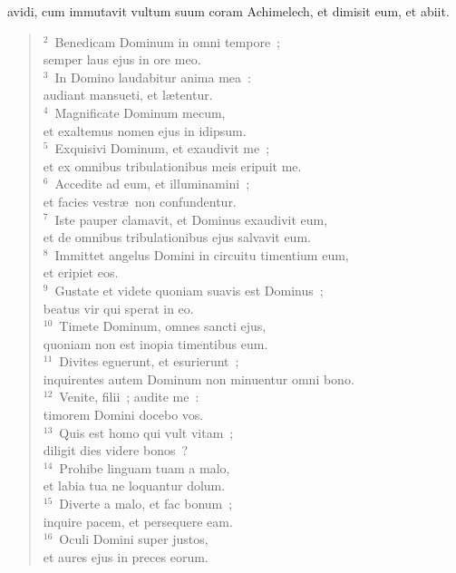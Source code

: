 \bchapter
{}avidi, cum immutavit vultum suum coram Achimelech, et dimisit eum, et abiit.
\begin{flushleft}\begin{verse}\vspace{6pt}${}^{2}$~Benedicam Dominum in omni tempore~;\\ semper laus ejus in ore meo.\\
${}^{3}$~In Domino laudabitur anima mea~:\\ audiant mansueti, et l\ae tentur.\\
${}^{4}$~Magnificate Dominum mecum,\\ et exaltemus nomen ejus in idipsum.\\
${}^{5}$~Exquisivi Dominum, et exaudivit me~;\\ et ex omnibus tribulationibus meis eripuit me.\\
${}^{6}$~Accedite ad eum, et illuminamini~;\\ et facies vestr\ae\ non confundentur.\\
${}^{7}$~Iste pauper clamavit, et Dominus exaudivit eum,\\ et de omnibus tribulationibus ejus salvavit eum.\\
${}^{8}$~Immittet angelus Domini in circuitu timentium eum,\\ et eripiet eos.\\
${}^{9}$~Gustate et videte quoniam suavis est Dominus~;\\ beatus vir qui sperat in eo.\\
${}^{10}$~Timete Dominum, omnes sancti ejus,\\ quoniam non est inopia timentibus eum.\\
${}^{11}$~Divites eguerunt, et esurierunt~;\\ inquirentes autem Dominum non minuentur omni bono.\\
${}^{12}$~Venite, filii~; audite me~:\\ timorem Domini docebo vos.\\
${}^{13}$~Quis est homo qui vult vitam~;\\ diligit dies videre bonos~?\\
${}^{14}$~Prohibe linguam tuam a malo,\\ et labia tua ne loquantur dolum.\\
${}^{15}$~Diverte a malo, et fac bonum~;\\ inquire pacem, et persequere eam.\\
${}^{16}$~Oculi Domini super justos,\\ et aures ejus in preces eorum.\\

\end{verse}
\end{flushleft}
